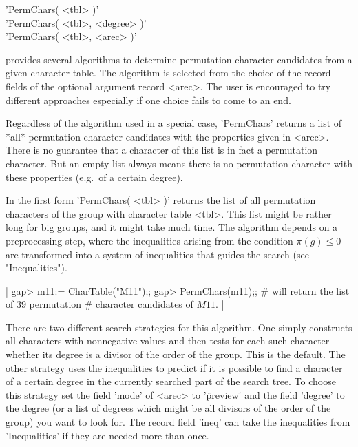 %

'PermChars( <tbl> )' \\
'PermChars( <tbl>, <degree> )' \\
'PermChars( <tbl>, <arec> )'

{\GAP} provides  several  algorithms to  determine  permutation character
candidates from a given  character table.  The algorithm is selected from
the  choice of the  record fields of the optional argument record <arec>.
The  user is  encouraged to  try different approaches  especially  if one
choice fails to come to an end.

Regardless of the algorithm used in a special case, 'PermChars' returns a
list of *all* permutation character candidates with  the properties given
in <arec>.  There is no guarantee  that  a character of this  list  is in
fact a  permutation character. But an empty list always means there is no
permutation character with these properties (e.g.\ of a certain degree).

In  the  first  form  'PermChars(  <tbl>  )'  returns  the  list  of  all
permutation characters of the group with character table <tbl>. This list
might be  rather long  for big groups, and it might take  much time.  The
algorithm depends on a preprocessing step, where the inequalities arising
from the  condition  $\pi(g)  \leq  0$ are transformed  into  a system of
inequalities that guides the search (see "Inequalities").

|    gap> m11:= CharTable("M11");;
    gap> PermChars(m11);;     # will return the list of 39 permutation
                              # character candidates of $M11$. |

There are two different search strategies for  this algorithm. One simply
constructs all characters with nonnegative values and then tests for each
such character whether its degree is a divisor of the order of the group.
This is the default.  The other strategy uses the inequalities to predict
if  it is  possible  to  find  a character  of  a  certain degree in  the
currently searched part  of the search  tree. To choose this strategy set
the field 'mode' of <arec> to '\"preview\"' and the field 'degree' to the
degree (or a list of degrees which might be all divisors  of the order of
the group) you  want to look for.  The  record field 'ineq' can  take the
inequalities from 'Inequalities' if they are needed more than once.

